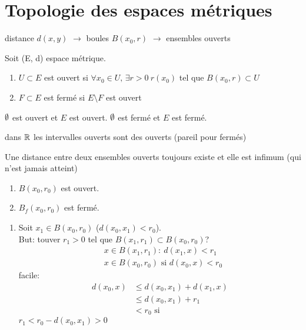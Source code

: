 \section{Topologie des espaces métriques}
distance $d(x, y)$ $\longrightarrow$ boules  $B(x_0, r)$ $\longrightarrow$ ensembles ouverts
\begin{definition}
    Soit (E, d) espace métrique.
    \begin{enumerate}
        \item $U \subset E$ est ouvert si $\forall x_0 \in U, \, \exists r > 0 \: r(x_0)$ tel que $B(x_0, r) \subset U$
        \item $F \subset E$ est fermé si $E \setminus F$ est ouvert
    \end{enumerate}
    $\emptyset$ est ouvert et $E$ est ouvert.  $\emptyset$ est fermé et $E$ est fermé.
\end{definition}
\begin{remark}
   dans $\mathbb{R}$ les intervalles ouverts sont des ouverts (pareil pour fermés) 
\end{remark}
\begin{remark}
   Une distance entre deux ensembles ouverts toujours existe et elle est infimum (qui n'est jamais atteint) 
\end{remark}
\begin{lemma}
   \begin{enumerate}
       \item $B(x_0, r_0)$ est ouvert.
       \item $B_f(x_0, r_0)$ est fermé.
   \end{enumerate} 
\end{lemma}
\begin{preuve}
   \begin{enumerate}
       \item Soit $x_1 \in B(x_0, r_0)$ ($d(x_0, x_1) < r_0$).\\
           But: touver $r_1 > 0$ tel que $B(x_1, r_1) \subset B(x_0, r_0)$?\\
           \begin{align*}
               &x \in B(x_1, r_1): \: d(x_1, x) < r_1\\
               &x \in B(x_0, r_0) \text{ si } d(x_0, x) < r_0
           \end{align*}
           facile:
           \begin{align*}
               d(x_0, x) &\le d(x_0, x_1) + d(x_1, x)\\
                         &\le d(x_0, x_1) + r_1\\
                         &< r_0 \text{ si}
           \end{align*}
           $r_1 < r_0 - d(x_0, x_1) > 0$
   \end{enumerate} 
\end{preuve}
